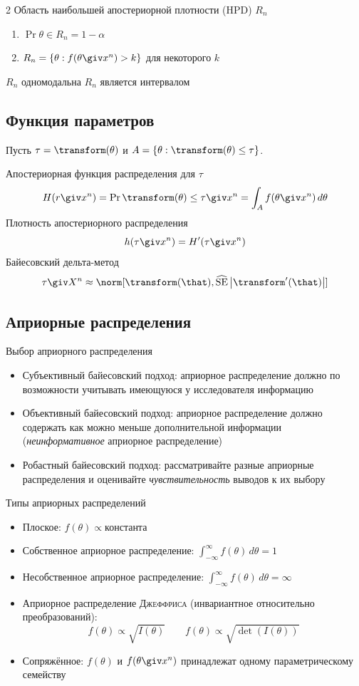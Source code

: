 \documentclass[landscape]{article}
\def\sehat{\ensuremath{\widehat{\mathrm{SE}}}}
\begin{document}
\begin{multicols*}{2}
Область наибольшей апостериорной плотности (HPD) $R_n$
\begin{enumerate}
  \item $\Pr{\theta\in R_n} = 1-\alpha$
  \item $R_n = \left\{ \theta: f(\theta\giv x^n) > k \right\}$ для некоторого $k$
\end{enumerate}
$R_n$ одномодальна \imp $R_n$ является интервалом

\subsection{Функция параметров}
Пусть $\tau = \transform(\theta)$ и $A =
\left\{ \theta:\transform(\theta) \le \tau \right\}$.

Апостериорная функция распределения для $\tau$
\[H(r\giv x^n)
= \Pr{\transform(\theta) \le \tau\giv x^n}
= \int_A f(\theta \giv x^n)\,d\theta\]
Плотность апостериорного распределения
\[h(\tau\giv x^n) = H'(\tau\giv x^n)\]
Байесовский дельта-метод
\[\tau\giv X^n \approx \norm[\transform(\that),
\sehat\left|\transform'(\that)\right|]\]

\subsection{Априорные распределения}

Выбор априорного распределения
\begin{itemize}
  \item Субъективный байесовский подход: априорное распределение должно
    по возможности учитывать имеющуюся у исследователя информацию
  \item Объективный байесовский подход: априорное распределение должно содержать
    как можно меньше дополнительной информации (\emph{неинформативное}
    априорное распределение)
  \item Робастный байесовский подход: рассматривайте разные априорные
    распределения и оценивайте \emph{чувствительность} выводов к их выбору
\end{itemize}

Типы априорных распределений
\begin{itemize}
  \item Плоское: $f(\theta) \propto \text{константа}$
  \item Собственное априорное распределение: $\int_{-\infty}^{\infty} f(\theta)\,d\theta = 1$
  \item Несобственное априорное распределение: $\int_{-\infty}^{\infty} f(\theta)\,d\theta = \infty$
  \item Априорное распределение \textsc{Джеффриса} (инвариантное относительно преобразований):
    \[f(\theta) \propto \sqrt{I(\theta)} \qquad
    f(\theta) \propto \sqrt{\det(I(\theta))}\]
  \item Сопряжённое: $f(\theta)$ и $f(\theta\giv x^n)$
    принадлежат одному параметрическому семейству
\end{itemize}


\end{multicols*}
\end{document}
